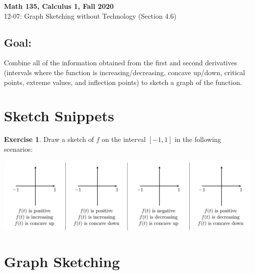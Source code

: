 \documentclass[11pt,reqno,final]{amsart}
\numberwithin{figure}{section}
\theoremstyle{definition} %
\newtheorem{exercise}[question]{Exercise}
\begin{document}
\begin{center}
        \textbf{\Large Math 135, Calculus 1, Fall 2020}\\[10pt]
        {\large 12-07: Graph Sketching without Technology (Section 4.6)}
\end{center}

\thispagestyle{empty}


\renewcommand{\thesection}{\Alph{section}}

\subsection*{Goal:} Combine all of the information obtained from the first and second derivatives (intervals where the function is increasing/decreasing, concave up/down, critical points, extreme values, and inflection points) to sketch a graph of the function.

\section{Sketch Snippets}

\begin{exercise}
        Draw a sketch of $f$ on the interval $[-1,1]$ in the following scenarios:
        \begin{center}
                \includegraphics[width=\textwidth]{12-07P.png}
        \end{center}
\end{exercise}

\newpage
\section{Graph Sketching}
\end{document}
